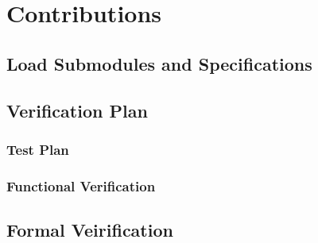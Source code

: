 \chapter{Contributions}
\section{Load Submodules and Specifications}

\section{Verification Plan}
\subsection{Test Plan}
\subsection{Functional Verification}

\section{Formal Veirification}

